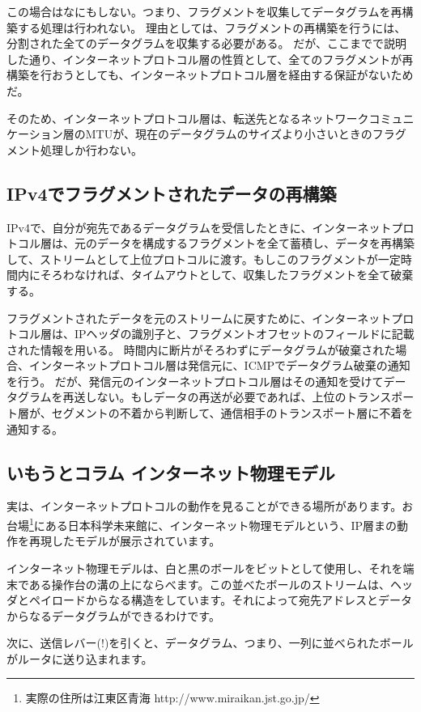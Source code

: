 この場合はなにもしない。つまり、フラグメントを収集してデータグラムを再構築する処理は行われない。
理由としては、フラグメントの再構築を行うには、分割された全てのデータグラムを収集する必要がある。
だが、ここまでで説明した通り、インターネットプロトコル層の性質として、全てのフラグメントが再構築を行おうとしても、インターネットプロトコル層を経由する保証がないためだ。

そのため、インターネットプロトコル層は、転送先となるネットワークコミュニケーション層のMTUが、現在のデータグラムのサイズより小さいときのフラグメント処理しか行わない。

\subsection{IPv4でフラグメントされたデータの再構築}

IPv4で、自分が宛先であるデータグラムを受信したときに、インターネットプロトコル層は、元のデータを構成するフラグメントを全て蓄積し、データを再構築して、ストリームとして上位プロトコルに渡す。もしこのフラグメントが一定時間内にそろわなければ、タイムアウトとして、収集したフラグメントを全て破棄する。

フラグメントされたデータを元のストリームに戻すために、インターネットプロトコル層は、IPヘッダの識別子と、フラグメントオフセットのフィールドに記載された情報を用いる。
時間内に断片がそろわずにデータグラムが破棄された場合、インターネットプロトコル層は発信元に、ICMPでデータグラム破棄の通知を行う。
だが、発信元のインターネットプロトコル層はその通知を受けてデータグラムを再送しない。もしデータの再送が必要であれば、上位のトランスポート層が、セグメントの不着から判断して、通信相手のトランスポート層に不着を通知する。


\subsection*{いもうとコラム インターネット物理モデル}


実は、インターネットプロトコルの動作を見ることができる場所があります。お台場\footnote{実際の住所は江東区青海 http://www.miraikan.jst.go.jp/}にある日本科学未来館に、インターネット物理モデルという、IP層まの動作を再現したモデルが展示されています。

インターネット物理モデルは、白と黒のボールをビットとして使用し、それを端末である操作台の溝の上にならべます。この並べたボールのストリームは、ヘッダとペイロードからなる構造をしています。それによって宛先アドレスとデータからなるデータグラムができるわけです。

次に、送信レバー(!)を引くと、データグラム、つまり、一列に並べられたボールがルータに送り込まれます。

